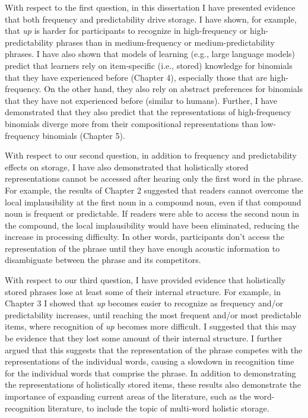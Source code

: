 \documentclass[
  12pt,
  letterpaper,
]{scrreport}
\begin{document}
With respect to the first question, in this dissertation I have
presented evidence that both frequency and predictability drive storage.
I have shown, for example, that \emph{up} is harder for participants to
recognize in high-frequency or high-predictability phrases than in
medium-frequency or medium-predictability phrases. I have also shown
that models of learning (e.g., large language models) predict that
learners rely on item-specific (i.e., stored) knowledge for binomials
that they have experienced before (Chapter 4), especially those that are
high-frequency. On the other hand, they also rely on abstract
preferences for binomials that they have not experienced before (similar
to humans). Further, I have demonstrated that they also predict that the
representations of high-frequency binomials diverge more from their
compositional representations than low-frequency binomials (Chapter 5).

With respect to our second question, in addition to frequency and
predictability effects on storage, I have also demonstrated that
holistically stored representations cannot be accessed after hearing
only the first word in the phrase. For example, the results of Chapter 2
suggested that readers cannot overcome the local implausibility at the
first noun in a compound noun, even if that compound noun is frequent or
predictable. If readers were able to access the second noun in the
compound, the local implausibility would have been eliminated, reducing
the increase in processing difficulty. In other words, participants
don't access the representation of the phrase until they have enough
acoustic information to disambiguate between the phrase and its
competitors.

With respect to our third question, I have provided evidence that
holistically stored phrases lose at least some of their internal
structure. For example, in Chapter 3 I showed that \emph{up} becomes
easier to recognize as frequency and/or predictability increases, until
reaching the most frequent and/or most predictable items, where
recognition of \emph{up} becomes more difficult. I suggested that this
may be evidence that they lost some amount of their internal structure.
I further argued that this suggests that the representation of the
phrase competes with the representations of the individual words,
causing a slowdown in recognition time for the individual words that
comprise the phrase. In addition to demonstrating the representations of
holistically stored items, these results also demonstrate the importance
of expanding current areas of the literature, such as the
word-recognition literature, to include the topic of multi-word holistic
storage.
\end{document}
